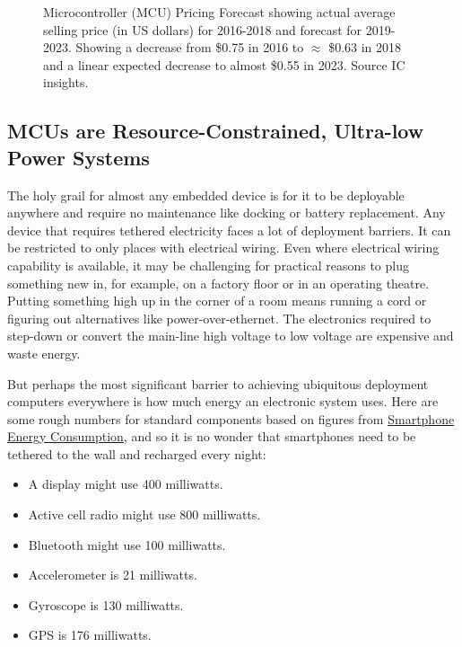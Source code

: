 \begin{figure}
    \caption{Microcontroller (MCU) Pricing Forecast showing actual average selling price (in US dollars) for 2016-2018 and forecast for 2019-2023. Showing a decrease from \$0.75 in 2016 to $\approx$ \$0.63 in 2018 and a linear expected decrease to almost \$0.55 in 2023. Source IC insights.}
\end{figure}  







\subsection{MCUs are Resource-Constrained, Ultra-low Power Systems}

The holy grail for almost any embedded device is for it to be deployable anywhere and require no maintenance like docking or battery replacement. Any device that requires tethered electricity faces a lot of deployment barriers. It can be restricted to only places with electrical wiring. Even where electrical wiring capability is available, it may be challenging for practical reasons to plug something new in, for example, on a factory floor or in an operating theatre. Putting something high up in the corner of a room means running a cord or figuring out alternatives like power-over-ethernet. The electronics required to step-down or convert the main-line high voltage to low voltage are expensive and waste energy.

But perhaps the most significant barrier to achieving ubiquitous deployment computers everywhere is how much energy an electronic system uses. Here are some rough numbers for standard components based on figures from \href{https://www.cambridge.org/us/academic/subjects/engineering/wireless-communications/smartphone-energy-consumption-modeling-and-optimization}{Smartphone Energy Consumption}, and so it is no wonder that smartphones need to be tethered to the wall and recharged every night:

\begin{itemize}
  \item A display might use 400 milliwatts.
  \item Active cell radio might use 800 milliwatts.
  \item Bluetooth might use 100 milliwatts.
  \item Accelerometer is 21 milliwatts.
  \item Gyroscope is 130 milliwatts.
  \item GPS is 176 milliwatts.
\end{itemize}

